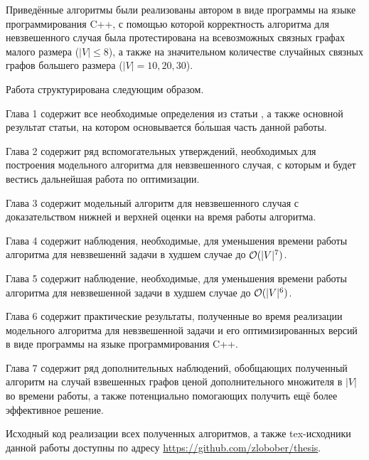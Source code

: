 Приведённые алгоритмы были реализованы автором в виде программы на языке программирования C++, с помощью которой корректность алгоритма для невзвешенного случая была протестирована на всевозможных связных графах малого размера ($|V| \leq 8$), а также на значительном количестве случайных связных графов большего размера ($|V| = 10, 20, 30$).

Работа структурирована следующим образом. 

Глава 1 содержит все необходимые определения из статьи \cite{ET}, а также основной результат статьи, на котором основывается б\'{о}льшая часть данной работы. 

Глава 2 содержит ряд вспомогательных утверждений, необходимых для построения модельного алгоритма для невзвешенного случая, с которым и будет вестись дальнейшая работа по оптимизации.

Глава 3 содержит модельный алгоритм для невзвешенного случая с доказательством нижней и верхней оценки на время работы алгоритма.

Глава 4 содержит наблюдения, необходимые, для уменьшения времени работы алгоритма для невзвешеннй задачи в худшем случае до $\mathcal{O}(|V|^7)$.

Глава 5 содержит наблюдение, необходимые, для уменьшения времени работы алгоритма для невзвешенной задачи в худшем случае до $\mathcal{O}(|V|^6)$.

Глава 6 содержит практические результаты, полученные во время реализации модельного алгоритма для невзвешенной задачи и его оптимизированных версий в виде программы на языке программирования C++.

Глава 7 содержит ряд дополнительных наблюдений, обобщающих полученный алгоритм на случай взвешенных графов ценой дополнительного множителя в $|V|$ во времени работы, а также потенциально помогающих получить ещё более эффективное решение. 

Исходный код реализации всех полученных алгоритмов, а также tex-исходники данной работы доступны по адресу \url{https://github.com/zlobober/thesis}.

